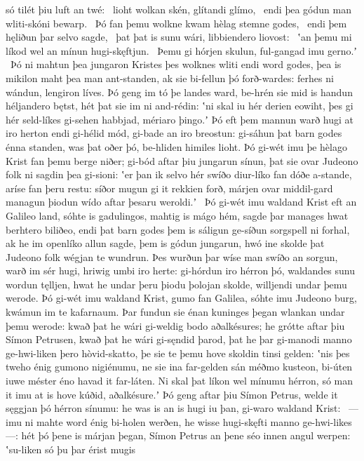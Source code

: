 só tilét þiu luft an twé: \hld\ lioht wolkan skén,
glítandi glímo, \hld\ endi þea gódun man
wliti-skóni bewarp. \hld\ Þó fan þemu wolkne kwam
hèlag stemne godes, \hld\ endi þem hęliðun þar
selvo sagde, \hld\ þat þat is sunu wári,
libbiendero liovost: \hld\ ʽan þemu mi líkod wel
an mínun hugi-skęftjun. \hld\ Þemu gi hórjen skulun,
ful-gangad imu gerno.ʼ \hld\ Þó ni mahtun þea jungaron Kristes
þes wolknes wliti endi word godes,
þea is mikilon maht þea man ant-standen,
ak sie bi-fellun þó forð-wardes: ferhes ni wándun,
lengiron líves. Þó geng im tó þe landes ward,
be-hrén sie mid is handun héljandero bętst,
hét þat sie im ni and-rédin: ʽni skal iu hér derien eowiht,
þes gi hér seld-líkes gi-sehen habbjad,
mériaro þingo.ʼ Þó eft þem mannun warð
hugi at iro herton endi gi-hélid mód,
gi-bade an iro breostun: gi-sáhun þat barn godes
énna standen, was þat oðer þó,
be-hliden himiles lioht. Þó gi-wét imu þe hèlago Krist
fan þemu berge niðer; gi-bód aftar þiu
jungarun sínun, þat sie ovar Judeono folk
ni sagdin þea gi-sioni: ʽer þan ik selvo hér
swíðo diur-líko fan dóðe a-stande,
aríse fan þeru restu: síðor mugun gi it rekkien forð,
márjen ovar middil-gard managun þiodun
wído aftar þesaru weroldi.ʼ \hld\ Þó gi-wét imu waldand Krist
eft an Galileo land, sóhte is gadulingos,
mahtig is mágo hém, sagde þar manages hwat
berhtero biliðeo, endi þat barn godes
þem is sáligun ge-síðun sorgspell ni forhal,
ak he im openlíko allun sagde,
þem is gódun jungarun, hwó ine skolde þat Judeono folk
wégjan te wundrun. Þes wurðun þar wíse man
swíðo an sorgun, warð im sér hugi,
hriwig umbi iro herte: gi-hórdun iro hérron þó,
waldandes sunu wordun tęlljen,
hwat he undar þeru þiodu þolojan skolde,
willjendi undar þemu werode. Þó gi-wét imu waldand Krist,
gumo fan Galilea, sóhte imu Judeono burg,
kwámun im te kafarnaum. Þar fundun sie énan kuninges þegan
wlankan undar þemu werode: kwað þat he wári gi-weldig bodo
aðalkésures; he grótte aftar þiu
Símon Petrusen, kwað þat he wári gi-sęndid þarod,
þat he þar gi-manodi manno ge-hwi-liken
þero hòvid-skatto, þe sie te þemu hove skoldin
tinsi gelden: ʽnis þes tweho énig
gumono nigiénumu, ne sie ina far-gelden sán
méðmo kusteon, bi-úten iuwe méster éno
havad it far-láten. Ni skal þat líkon wel
mínumu hérron, só man it imu at is hove kúðid,
aðalkésure.ʼ Þó geng aftar þiu
Símon Petrus, welde it sęggjan þó
hérron sínumu: he was is an is hugi iu þan,
gi-waro waldand Krist: \hld\ —imu ni mahte word énig
bi-holen werðen, he wisse hugi-skęfti
manno ge-hwi-likes—: hét þó þene is márjan þegan,
Símon Petrus an þene séo innen
angul werpen: ʽsu-liken só þu þar érist mugis
